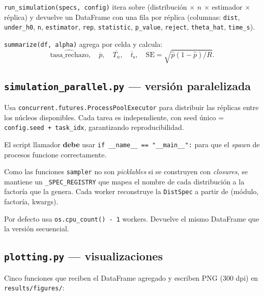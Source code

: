 \documentclass[11pt,a4paper]{article}
\begin{document}
\texttt{run\_simulation(specs, config)} itera sobre (distribución $\times$ $n$ $\times$ estimador $\times$ réplica) y devuelve un DataFrame con una fila por réplica (columnas: \texttt{dist}, \texttt{under\_h0}, \texttt{n}, \texttt{estimator}, \texttt{rep}, \texttt{statistic}, \texttt{p\_value}, \texttt{reject}, \texttt{theta\_hat}, \texttt{time\_s}).

\texttt{summarize(df, alpha)} agrega por celda y calcula:
\[
  \widehat{\mathrm{tasa\_rechazo}}, \quad
  \overline{p}, \quad
  \overline{T_n}, \quad
  \overline{t}_{\text{s}}, \quad
  \mathrm{SE} = \sqrt{\hat p (1-\hat p)/R}.
\]

\subsection{\texttt{simulation\_parallel.py} --- versión paralelizada}

Usa \texttt{concurrent.futures.ProcessPoolExecutor} para distribuir las réplicas entre los núcleos disponibles. Cada tarea es independiente, con seed único = \texttt{config.seed + task\_idx}, garantizando reproducibilidad.

\begin{notebox}[title=Importante (Windows)]
El script llamador \textbf{debe} usar \texttt{if \_\_name\_\_ == "\_\_main\_\_":} para que el \emph{spawn} de procesos funcione correctamente.
\end{notebox}

Como las funciones \texttt{sampler} no son \emph{picklables} si se construyen con \emph{closures}, se mantiene un \texttt{\_SPEC\_REGISTRY} que mapea el nombre de cada distribución a la factoría que la genera. Cada worker reconstruye la \texttt{DistSpec} a partir de (módulo, factoría, kwargs).

Por defecto usa \texttt{os.cpu\_count() - 1} workers. Devuelve el mismo DataFrame que la versión secuencial.

\subsection{\texttt{plotting.py} --- visualizaciones}

Cinco funciones que reciben el DataFrame agregado y escriben PNG (300 dpi) en \texttt{results/figures/}:
\end{document}
